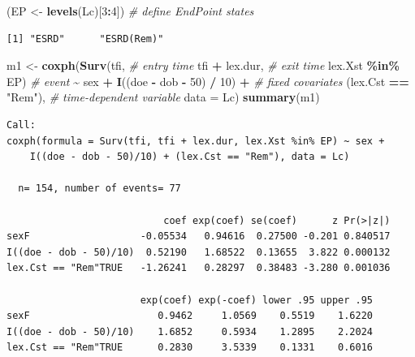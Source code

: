 \documentclass[
]{book}
\newenvironment{Shaded}{\begin{snugshade}}{\end{snugshade}}
\newcommand{\AttributeTok}[1]{\textcolor[rgb]{0.13,0.29,0.53}{#1}}
\newcommand{\CommentTok}[1]{\textcolor[rgb]{0.56,0.35,0.01}{\textit{#1}}}
\newcommand{\DecValTok}[1]{\textcolor[rgb]{0.00,0.00,0.81}{#1}}
\newcommand{\FunctionTok}[1]{\textcolor[rgb]{0.13,0.29,0.53}{\textbf{#1}}}
\newcommand{\NormalTok}[1]{#1}
\newcommand{\OtherTok}[1]{\textcolor[rgb]{0.56,0.35,0.01}{#1}}
\newcommand{\SpecialCharTok}[1]{\textcolor[rgb]{0.81,0.36,0.00}{\textbf{#1}}}
\newcommand{\StringTok}[1]{\textcolor[rgb]{0.31,0.60,0.02}{#1}}
\theoremstyle{definition}
\theoremstyle{definition}
\theoremstyle{definition}
\theoremstyle{definition}
\theoremstyle{remark}
\begin{document}
\begin{enumerate}
\begin{Shaded}
\begin{Highlighting}[]
\NormalTok{(EP }\OtherTok{\textless{}{-}} \FunctionTok{levels}\NormalTok{(Lc)[}\DecValTok{3}\SpecialCharTok{:}\DecValTok{4}\NormalTok{])           }\CommentTok{\# define EndPoint states}
\end{Highlighting}
\end{Shaded}

\begin{verbatim}
[1] "ESRD"      "ESRD(Rem)"
\end{verbatim}

\begin{Shaded}
\begin{Highlighting}[]
\NormalTok{m1 }\OtherTok{\textless{}{-}} \FunctionTok{coxph}\NormalTok{(}\FunctionTok{Surv}\NormalTok{(tfi,             }\CommentTok{\# entry time}
\NormalTok{                 tfi }\SpecialCharTok{+}\NormalTok{ lex.dur,   }\CommentTok{\# exit time}
\NormalTok{                 lex.Xst }\SpecialCharTok{\%in\%}\NormalTok{ EP) }\CommentTok{\# event}
            \SpecialCharTok{\textasciitilde{}}\NormalTok{ sex }\SpecialCharTok{+} \FunctionTok{I}\NormalTok{((doe }\SpecialCharTok{{-}}\NormalTok{ dob }\SpecialCharTok{{-}} \DecValTok{50}\NormalTok{) }\SpecialCharTok{/} \DecValTok{10}\NormalTok{) }\SpecialCharTok{+} \CommentTok{\# fixed covariates}
\NormalTok{              (lex.Cst }\SpecialCharTok{==} \StringTok{"Rem"}\NormalTok{),              }\CommentTok{\# time{-}dependent variable}
            \AttributeTok{data =}\NormalTok{ Lc)}
\FunctionTok{summary}\NormalTok{(m1)}
\end{Highlighting}
\end{Shaded}

\begin{verbatim}
Call:
coxph(formula = Surv(tfi, tfi + lex.dur, lex.Xst %in% EP) ~ sex + 
    I((doe - dob - 50)/10) + (lex.Cst == "Rem"), data = Lc)

  n= 154, number of events= 77 

                           coef exp(coef) se(coef)      z Pr(>|z|)
sexF                   -0.05534   0.94616  0.27500 -0.201 0.840517
I((doe - dob - 50)/10)  0.52190   1.68522  0.13655  3.822 0.000132
lex.Cst == "Rem"TRUE   -1.26241   0.28297  0.38483 -3.280 0.001036

                       exp(coef) exp(-coef) lower .95 upper .95
sexF                      0.9462     1.0569    0.5519    1.6220
I((doe - dob - 50)/10)    1.6852     0.5934    1.2895    2.2024
lex.Cst == "Rem"TRUE      0.2830     3.5339    0.1331    0.6016


\end{verbatim}
\end{enumerate}
\end{document}
